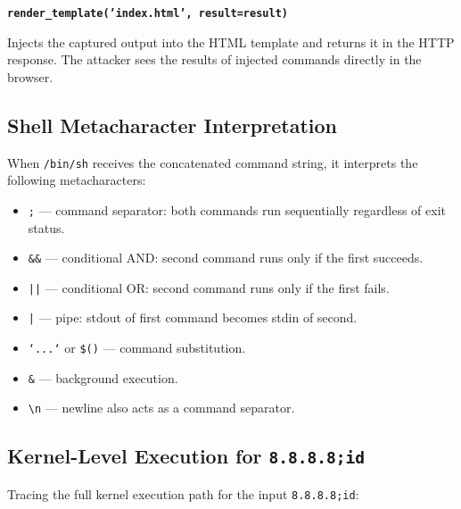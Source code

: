 \textbf{\texttt{render\_template('index.html', result=result)}}

Injects the captured output into the HTML template and returns it in the HTTP response. The attacker sees the results of injected commands directly in the browser.

\subsection{Shell Metacharacter Interpretation}

When \texttt{/bin/sh} receives the concatenated command string, it interprets the following metacharacters:

\begin{itemize}
    \item \texttt{;} --- command separator: both commands run sequentially regardless of exit status.
    \item \texttt{\&\&} --- conditional AND: second command runs only if the first succeeds.
    \item \texttt{||} --- conditional OR: second command runs only if the first fails.
    \item \texttt{|} --- pipe: stdout of first command becomes stdin of second.
    \item \texttt{`...`} or \texttt{\$()} --- command substitution.
    \item \texttt{\&} --- background execution.
    \item \texttt{\textbackslash n} --- newline also acts as a command separator.
\end{itemize}

\subsection{Kernel-Level Execution for \texttt{8.8.8.8;id}}

Tracing the full kernel execution path for the input \texttt{8.8.8.8;id}:

